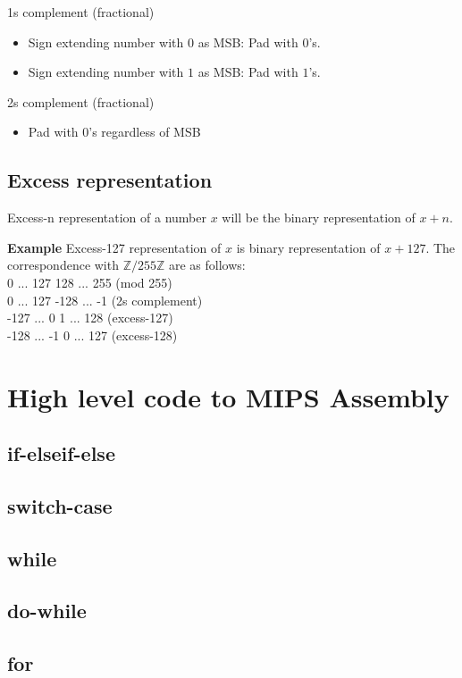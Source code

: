 \documentclass{article}
\begin{document}
1s complement (fractional)
\begin{itemize}
	\item Sign extending number with $0$ as MSB: Pad with $0$'s.
	\item Sign extending number with $1$ as MSB: Pad with $1$'s.
\end{itemize}

2s complement (fractional)
\begin{itemize}
	\item Pad with $0$'s regardless of MSB
\end{itemize}

\subsection{Excess representation}
Excess-n representation of a number $x$ will be the binary representation of $x+n$.

\textbf{Example} Excess-127 representation of $x$ is binary representation of $x+127$.
The correspondence with $\mathbb{Z}/255\mathbb{Z}$ are as follows:\\
0 ... 127 128 ... 255 (mod 255)\\
0 ... 127 -128 ... -1 (2s complement)\\
-127 ... 0 1 ... 128 (excess-127)\\
-128 ... -1 0 ... 127 (excess-128)

\section{High level code to MIPS Assembly}
\subsection{if-elseif-else}

\subsection{switch-case}

\subsection{while}

\subsection{do-while}

\subsection{for}
\end{document}
